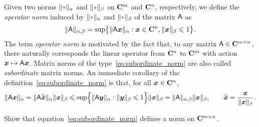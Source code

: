 Given two norms $\norm{\placeholder}_{\alpha}$ and $\norm{\placeholder}_{\beta}$ on $\mathbf C^m$ and $\mathbf C^n$, respectively,
we define the \emph{operator norm} induced by $\norm{\placeholder}_{\alpha}$ and $\norm{\placeholder}_{\beta}$ of the matrix $\mathsf A$ as
\begin{equation}
    \label{eq:subordinate_norm}
    \lVert\mathsf A\rVert_{\alpha,\beta} = \sup \bigl\{ \lVert\mathsf A \mathbf{\boldsymbol{x}}\rVert_{\alpha} : \mathbf{\boldsymbol{x}} \in \mathbf C^n, \lVert\mathbf{\boldsymbol{x}}\rVert_{\beta} \leqslant 1 \bigr\}.
\end{equation}
The term \emph{operator norm} is motivated by the fact that,
to any matrix $\mathsf A \in \mathbf C^{m \times n}$, there naturally corresponds the linear operator from $\mathbf C^n$ to $\mathbf C^m$ with action~$\mathbf{\boldsymbol{x}} \mapsto \mathsf A \mathbf{\boldsymbol{x}}$.
Matrix norms of the type~\eqref{eq:subordinate_norm} are also called \emph{subordinate} matrix norms.
An immediate corollary of the definition~\eqref{eq:subordinate_norm} is that,
for all $\mathbf{\boldsymbol{x}} \in \mathbf C^n$,
\begin{equation}
    \label{eq:submultiplicative_mat_vec}%
    \norm{\mat A \vect x}_{\alpha}
    = \norm{\mat A \widehat{\vect x}}_{\alpha} \norm{\vect x}_{\beta}
    \leq \sup \Bigl\{ \norm{\mat A \vect y}_{\alpha}: \norm{\vect y}_{\beta} \leq 1 \Bigr\} \norm{\vect x}_{\beta}
    = \norm{\mat A}_{\alpha,\beta} \norm{\vect x}_{\beta},
    \qquad \widehat {\vect x} = \frac{\vect x}{\norm{\vect x}_{\beta}}.
\end{equation}

\begin{exercise}
    Show that equation~\eqref{eq:subordinate_norm} defines a norm on $\mathbf C^{m \times n}$.
\end{exercise}

